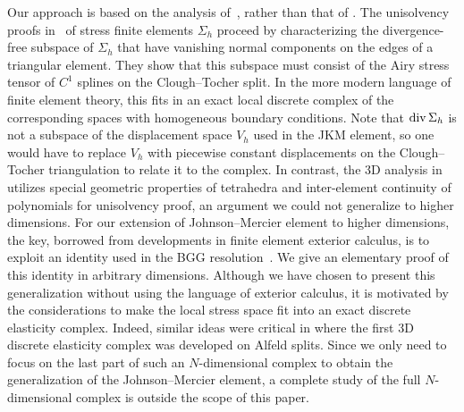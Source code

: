 \documentclass[12pt]{amsart}
\numberwithin{equation}{section}
\theoremstyle{definition}
\theoremstyle{remark}
\renewcommand{\(}{\bigl(}
\renewcommand{\)}{\bigr)}
\newcommand{\dive}{{\ensuremath\mathop{\mathrm{div}\,}}} %
\begin{document}
Our approach is based on the analysis
of~\cite{arnold1984family,johnson1978some}, rather than that of
\cite{Krizek1982}. The unisolvency proofs
in~\cite{arnold1984family,johnson1978some} of stress finite elements
$\Sigma_h$ proceed by characterizing the divergence-free subspace of
$\Sigma_h$ that have vanishing normal components on the edges of a
triangular element. They show that this subspace must consist of
the Airy stress tensor of $C^1$ splines on the Clough--Tocher split. In the more modern
language of finite element theory, this fits in an exact local discrete
complex of the corresponding spaces with homogeneous boundary conditions.
Note
that $\dive \Sigma_h$ is not a subspace of the displacement space
$V_h$ used in the JKM element, so one would have to
replace $V_h$ with piecewise constant displacements on the
Clough--Tocher triangulation to relate it to the complex. In contrast,
the 3D analysis in \cite{Krizek1982}
utilizes special geometric properties of tetrahedra and inter-element
continuity of polynomials for unisolvency proof, an argument
we could not  generalize to higher dimensions. For our extension of 
Johnson--Mercier element to higher  dimensions, the key, borrowed from
developments in  finite element exterior calculus, is to exploit an
identity used in the BGG resolution~\cite{arnold2007mixed,calabi1961compact, eastwood2000complex}. We give an elementary proof of
this identity in arbitrary dimensions.  Although we have chosen to
present this generalization without using the language of exterior calculus, 
it is  motivated by the considerations to make the local stress
space fit into an exact discrete elasticity complex. Indeed, similar
ideas were critical in \cite{christiansen2020discrete} where the first
3D discrete elasticity complex was developed on Alfeld splits. Since
we only need to focus on the last part of such an $N$-dimensional
complex to obtain the generalization of the Johnson--Mercier element, a
complete study of the full $N$-dimensional complex is outside the
scope of this paper.



\end{document}

